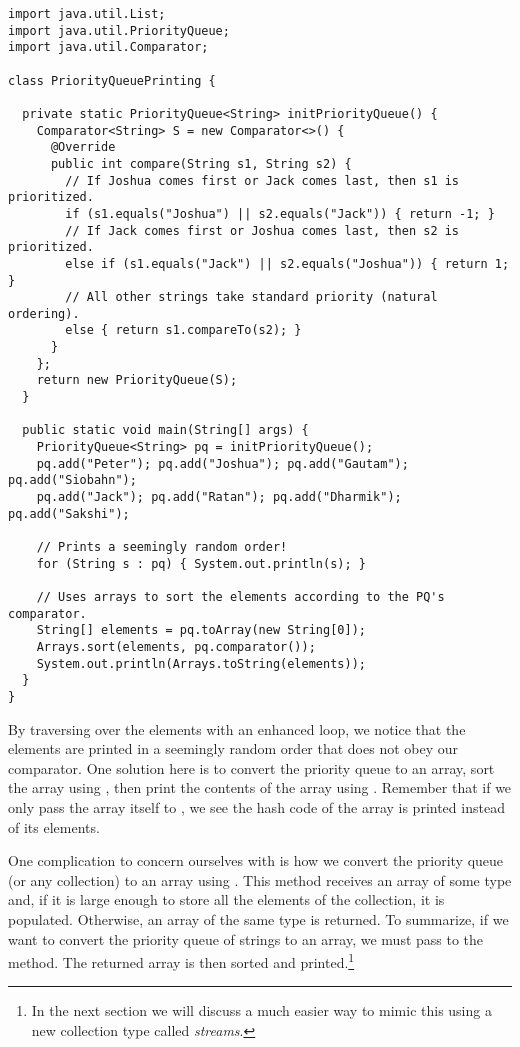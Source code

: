 \begin{cl}[]{}
\begin{lstlisting}[language=MyJava]
import java.util.List;
import java.util.PriorityQueue;
import java.util.Comparator;

class PriorityQueuePrinting {

  private static PriorityQueue<String> initPriorityQueue() {
    Comparator<String> S = new Comparator<>() {
      @Override
      public int compare(String s1, String s2) {
        // If Joshua comes first or Jack comes last, then s1 is prioritized.
        if (s1.equals("Joshua") || s2.equals("Jack")) { return -1; } 
        // If Jack comes first or Joshua comes last, then s2 is prioritized.
        else if (s1.equals("Jack") || s2.equals("Joshua")) { return 1; } 
        // All other strings take standard priority (natural ordering).
        else { return s1.compareTo(s2); }
      }
    };
    return new PriorityQueue(S);
  }

  public static void main(String[] args) {
    PriorityQueue<String> pq = initPriorityQueue();
    pq.add("Peter"); pq.add("Joshua"); pq.add("Gautam"); pq.add("Siobahn");
    pq.add("Jack"); pq.add("Ratan"); pq.add("Dharmik"); pq.add("Sakshi");

    // Prints a seemingly random order!
    for (String s : pq) { System.out.println(s); }

    // Uses arrays to sort the elements according to the PQ's comparator.
    String[] elements = pq.toArray(new String[0]);
    Arrays.sort(elements, pq.comparator());
    System.out.println(Arrays.toString(elements));
  }
}
\end{lstlisting}
\end{cl}

By traversing over the elements with an enhanced  loop, we notice that the elements are printed in a seemingly random order that does not obey our comparator. One solution here is to convert the priority queue to an array, sort the array using , then print the contents of the array using . Remember that if we only pass the array itself to , we see the hash code of the array is printed instead of its elements. 

One complication to concern ourselves with is how we convert the priority queue (or any collection) to an array using . This method receives an array of some type  and, if it is large enough to store all the elements of the collection, it is populated. Otherwise, an array of the same type  is returned. To summarize, if we want to convert the priority queue of strings to an array, we must pass  to the  method. The returned array is then sorted and printed.\footnote{In the next section we will discuss a much easier way to mimic this using a new collection type called \emph{streams}.} 

